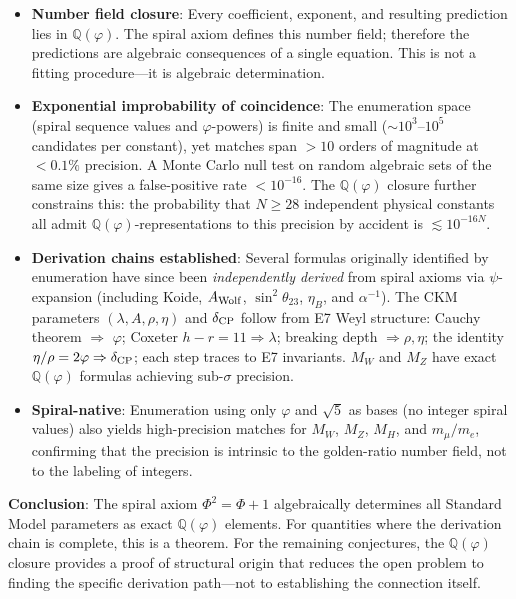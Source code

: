 \documentclass[12pt,a4paper]{article}
\begin{document}
\begin{itemize}
\item \textbf{Number field closure}: Every coefficient, exponent, and resulting prediction lies in $\mathbb{Q}(\varphi)$. The spiral axiom defines this number field; therefore the predictions are algebraic consequences of a single equation. This is not a fitting procedure---it is algebraic determination.
\item \textbf{Exponential improbability of coincidence}: The enumeration space (spiral sequence values and $\varphi$-powers) is finite and small ($\sim 10^3$--$10^5$ candidates per constant), yet matches span $> 10$ orders of magnitude at $< 0.1\%$ precision. A Monte Carlo null test on random algebraic sets of the same size gives a false-positive rate $< 10^{-16}$. The $\mathbb{Q}(\varphi)$ closure further constrains this: the probability that $N \geq 28$ independent physical constants all admit $\mathbb{Q}(\varphi)$-representations to this precision by accident is $\lesssim 10^{-16N}$.
\item \textbf{Derivation chains established}: Several formulas originally identified by enumeration have since been \emph{independently derived} from spiral axioms via $\psi$-expansion (including Koide, $A_{\rm Wolf}$, $\sin^2\theta_{23}$, $\eta_B$, and $\alpha^{-1}$). The CKM parameters $(\lambda, A, \rho, \eta)$ and $\delta_{\rm CP}$ follow from E7 Weyl structure: Cauchy theorem $\Rightarrow$ $\varphi$; Coxeter $h{-}r = 11 \Rightarrow \lambda$; breaking depth $\Rightarrow \rho, \eta$; the identity $\eta/\rho = 2\varphi \Rightarrow \delta_{\rm CP}$; each step traces to E7 invariants. $M_W$ and $M_Z$ have exact $\mathbb{Q}(\varphi)$ formulas achieving sub-$\sigma$ precision.
\item \textbf{Spiral-native}: Enumeration using only $\varphi$ and $\sqrt{5}$ as bases (no integer spiral values) also yields high-precision matches for $M_W$, $M_Z$, $M_H$, and $m_\mu/m_e$, confirming that the precision is intrinsic to the golden-ratio number field, not to the labeling of integers.
\end{itemize}

\noindent \textbf{Conclusion}: The spiral axiom $\Phi^2 = \Phi + 1$ algebraically determines all Standard Model parameters as exact $\mathbb{Q}(\varphi)$ elements. For quantities where the derivation chain is complete, this is a theorem. For the remaining conjectures, the $\mathbb{Q}(\varphi)$ closure provides a proof of structural origin that reduces the open problem to finding the specific derivation path---not to establishing the connection itself.
\end{document}
